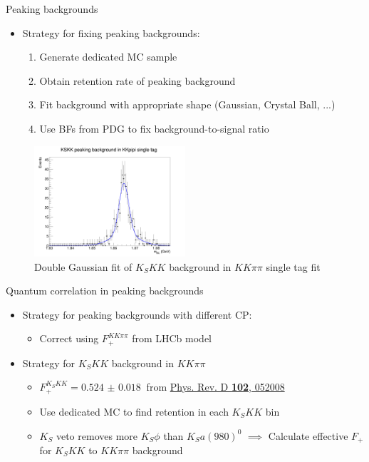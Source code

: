 \documentclass{beamer}
\begin{document}
\begin{frame}{Peaking backgrounds}
  \begin{itemize}
    \item{Strategy for fixing peaking backgrounds:}
    \begin{enumerate}
      \item{Generate dedicated MC sample}
      \item{Obtain retention rate of peaking background}
      \item{Fit background with appropriate shape (Gaussian, Crystal Ball, ...)}
      \item{Use BFs from PDG to fix background-to-signal ratio}
    \end{enumerate}
  \end{itemize}
  \begin{figure}
    \centering
    \includegraphics[width=0.50\textwidth]{Plots/KSKKtoKKpipi_Fit.png}
    \caption{Double Gaussian fit of $K_SKK$ background in $KK\pi\pi$ single tag fit}
  \end{figure}
\end{frame}

\begin{frame}{Quantum correlation in peaking backgrounds}
  \begin{itemize}
    \item{Strategy for peaking backgrounds with different CP:}
    \begin{itemize}
      \item{Correct using $F_+^{KK\pi\pi}$ from LHCb model}
    \end{itemize}
    \item{Strategy for $K_SKK$ background in $KK\pi\pi$}
    \begin{itemize}
      \item{$F_+^{K_SKK} = \SI{0.524(18)}{}$ from \href{https://arxiv.org/abs/2007.07959}{Phys. Rev. D \textbf{102}, 052008}}
      \item{Use dedicated MC to find retention in each $K_SKK$ bin}
      \item{$K_S$ veto removes more $K_S\phi$ than $K_Sa(980)^0$ $\implies$ Calculate effective $F_+$ for $K_SKK$ to $KK\pi\pi$ background}
    \end{itemize}
  \end{itemize}
\end{frame}
\end{document}
